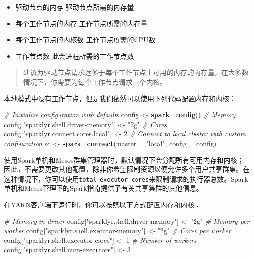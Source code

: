 \documentclass[
]{article}
\newenvironment{Shaded}{\begin{snugshade}}{\end{snugshade}}
\newcommand{\CommentTok}[1]{\textcolor[rgb]{0.56,0.35,0.01}{\textit{#1}}}
\newcommand{\DataTypeTok}[1]{\textcolor[rgb]{0.13,0.29,0.53}{#1}}
\newcommand{\DecValTok}[1]{\textcolor[rgb]{0.00,0.00,0.81}{#1}}
\newcommand{\KeywordTok}[1]{\textcolor[rgb]{0.13,0.29,0.53}{\textbf{#1}}}
\newcommand{\NormalTok}[1]{#1}
\newcommand{\StringTok}[1]{\textcolor[rgb]{0.31,0.60,0.02}{#1}}
\providecommand{\tightlist}{%
  \setlength{\itemsep}{0pt}\setlength{\parskip}{0pt}}
\begin{document}
\begin{itemize}
\tightlist
\item
  驱动节点的内存 驱动节点所需的内存量
\item
  每个工作节点的内存 工作节点所需的内存量
\item
  每个工作节点的内核数 工作节点所需的CPU数
\item
  工作节点数 此会进程所需的工作节点数
\end{itemize}

\begin{quote}
建议为驱动节点请求远多于每个工作节点上可用的内存的内存量。在大多数情况下，你需要为每个工作节点请求一个内核。
\end{quote}

本地模式中没有工作节点，但是我们依然可以使用下列代码配置内存和内核：

\begin{Shaded}
\begin{Highlighting}[]
\CommentTok{# Initialize configuration with defaults}
\NormalTok{config <-}\StringTok{ }\KeywordTok{spark_config}\NormalTok{()}
\CommentTok{# Memory}
\NormalTok{config[}\StringTok{"sparklyr.shell.driver-memory"}\NormalTok{] <-}\StringTok{ "2g"}
\CommentTok{# Cores}
\NormalTok{config[}\StringTok{"sparklyr.connect.cores.local"}\NormalTok{] <-}\StringTok{ }\DecValTok{2}
\CommentTok{# Connect to local cluster with custom configuration}
\NormalTok{sc <-}\StringTok{ }\KeywordTok{spark_connect}\NormalTok{(}\DataTypeTok{master =} \StringTok{"local"}\NormalTok{, }\DataTypeTok{config =}\NormalTok{ config)}
\end{Highlighting}
\end{Shaded}

使用Spark单机和Mesos群集管理器时，默认情况下会分配所有可用内存和内核；因此，不需要更改其他配置，除非你希望限制资源以便允许多个用户共享群集。在这种情况下，你可以使用\texttt{total-executor-cores}来限制请求的执行器总数。Spark单机和Mesos管理下的Spark指南提供了有关共享集群的其他信息。

在YARN客户端下运行时，你可以按照以下方式配置内存和内核：

\begin{Shaded}
\begin{Highlighting}[]
\CommentTok{# Memory in driver}
\NormalTok{config[}\StringTok{"sparklyr.shell.driver-memory"}\NormalTok{] <-}\StringTok{ "2g"}
\CommentTok{# Memory per worker}
\NormalTok{config[}\StringTok{"sparklyr.shell.executor-memory"}\NormalTok{] <-}\StringTok{ "2g"}
\CommentTok{# Cores per worker}
\NormalTok{config[}\StringTok{"sparklyr.shell.executor-cores"}\NormalTok{] <-}\StringTok{ }\DecValTok{1}
\CommentTok{# Number of workers}
\NormalTok{config[}\StringTok{"sparklyr.shell.num-executors"}\NormalTok{] <-}\StringTok{ }\DecValTok{3}
\end{Highlighting}
\end{Shaded}
\end{document}

